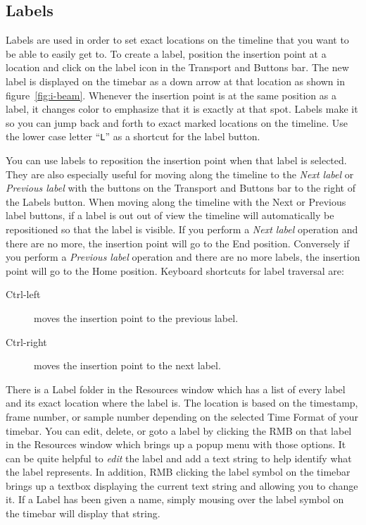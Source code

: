 \subsection{Labels}%
\label{sub:labels}

Labels are used in order to set exact locations on the timeline that you want to be able to easily get to. 
To create a label, position the insertion point at a location and click on the label icon in the Transport
and Buttons bar. The new label is displayed on the timebar as a down arrow at that location as shown in
figure~\ref{fig:i-beam}.  Whenever the insertion point is at the same position as a label, it changes
color to emphasize that it is exactly at that spot.
Labels make it so you can jump back and forth to exact marked locations on the timeline.
Use the lower case letter “\texttt{L}” as a shortcut for the label button.

You can use labels to reposition the insertion point when that label is selected. They are also
especially useful for moving along the timeline to the \textit{Next label} or \textit{Previous label}
with the buttons on the Transport and Buttons bar to the right of the Labels button.  
When moving along the timeline with the Next or Previous label buttons, if a label is out 
out of view the timeline will automatically be repositioned so that the label is visible.
If you perform a \textit{Next label} operation and there are no more, the insertion point
will go to the End position.  Conversely if you perform a \textit{Previous label} operation
and there are no more labels, the insertion point will go to the Home position. 
Keyboard shortcuts for label traversal are:

\begin{description}
    \item[Ctrl-left] moves the insertion point to the previous label.
    \item[Ctrl-right] moves the insertion point to the next label.
\end{description}

There is a  Label folder in the Resources window which has a list of every label and its exact location
where the label is. The location is based on the timestamp, frame number, or sample number depending on the selected Time Format of your timebar. 
You can edit, delete, or goto a label by clicking the RMB on that label in the Resources window which
brings up a popup menu with those options.  It can be quite helpful to \textit{edit} the label
and add a text string to help identify what the label represents.
In addition, RMB clicking the label symbol on the timebar brings up a textbox displaying the current
text string and allowing you to change it. If a Label has been given a name, simply mousing over
the label symbol on the timebar will display that string.


